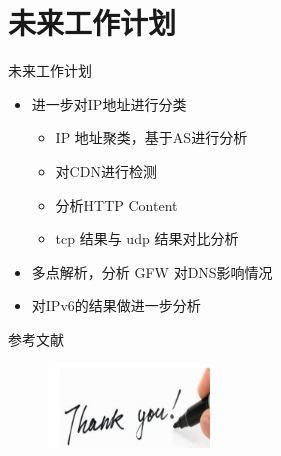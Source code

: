 \documentclass{beamer}
\begin{document}




\section{未来工作计划}

  \begin{frame}{未来工作计划}
    \begin{itemize}
      \item 进一步对IP地址进行分类
      \begin{itemize}
        \item IP 地址聚类，基于AS进行分析
        \item 对CDN进行检测
        \item 分析HTTP Content
        \item tcp 结果与 udp 结果对比分析
      \end{itemize}
      \item 多点解析，分析 GFW 对DNS影响情况
      \item 对IPv6的结果做进一步分析
    \end{itemize}
  \end{frame}


 \begin{frame}{参考文献}
  \tiny
  
\end{frame}

\begin{frame}
  \begin{figure}
    \includegraphics[height=2.23cm,width=4.29cm]{images/thank.jpg}
  \end{figure} 
\end{frame}
\end{document}
